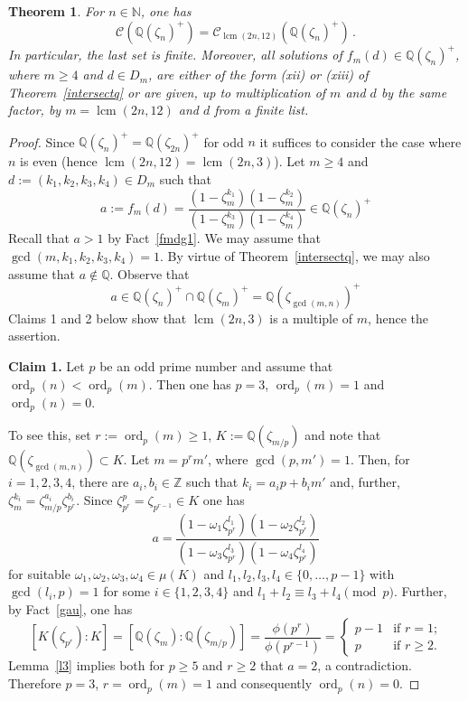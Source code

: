\documentclass[a4paper]{amsart}
\newtheorem{theorem}{Theorem}[section]
\theoremstyle{definition}
\numberwithin{equation}{section}
\numberwithin{theorem}{section}
\begin{document}
\begin{theorem}\label{t1}
For $n\in{\mathbb{N}}$, one has
$$\mathcal{C}({\mathbb{Q}}(\zeta_n)^+)=\mathcal{C}_{\operatorname{lcm}(2n,12)}({\mathbb{Q}}(\zeta_n)^+)\,.$$
In particular, the last set is finite. Moreover, all solutions of $f_{m}(d)\in{\mathbb{Q}}(\zeta_n)^+$, where $m\geq 4$ and
$d\in D_{m}$, are either of the form
(xii) or (xiii) of Theorem~\ref{intersectq} or are  given, up to multiplication of $m$
and $d$ by the same factor, by $m=\operatorname{lcm}(2n,12)$ and $d$
from a finite list. 
\end{theorem}
\begin{proof}
Since ${\mathbb{Q}}(\zeta_n)^+={\mathbb{Q}}(\zeta_{2n})^+$ for odd $n$ it suffices to
consider the case where $n$ is even (hence
$\operatorname{lcm}(2n,12)=\operatorname{lcm}(2n,3)$). Let $m\geq 4$
and $d:=(k_1,k_2,k_3,k_4)\in D_{m}$ such that
$$a:=f_m(d)=\frac{(1-\zeta_{m}^{k_1})(1-\zeta_{m}^{k_2})}{(1-\zeta_{m}^{k_3})(1-\zeta_{m}^{k_4})}\in{\mathbb{Q}}(\zeta_n)^+$$
Recall that $a>1$ by Fact~\ref{fmdg1}.  We may
assume that $\operatorname{gcd}(m,k_1,k_2,k_3,k_4)=1$.  By virtue of Theorem~\ref{intersectq}, we
may also assume that $a\not\in{\mathbb{Q}}$. Observe that
$$a\in{\mathbb{Q}}(\zeta_n)^+\cap {\mathbb{Q}}(\zeta_m)^+= {\mathbb{Q}}(\zeta_{\operatorname{gcd}(m,n)})^+$$
Claims 1 and 2 below show that $\operatorname{lcm}(2n,3)$ is a
multiple of $m$, hence the assertion.

 {\bf Claim 1.} Let $p$ be an odd prime number and assume that
 $\operatorname{ord}_p(n)<\operatorname{ord}_p(m)$. Then one has $p=3$,
$\operatorname{ord}_p(m)=1$ and $\operatorname{ord}_p(n)=0$.

To see this, set $r:=\operatorname{ord}_p(m)\geq 1$, 
$K:={\mathbb{Q}}(\zeta_{m/p})$ and note that $
{\mathbb{Q}}(\zeta_{\operatorname{gcd}(m,n)})\subset K$. Let $m=p^rm'$,
where $\operatorname{gcd}(p,m')=1$. Then, for $i=1,2,3,4$,
there are $a_i,b_i\in{\mathbb{Z}}$ such that $k_i=a_ip+b_i m'$ and, further, 
$\zeta_m^{k_i}=\zeta_{m/p}^{a_i}\zeta_{p^r}^{b_i}$. Since $\zeta_{p^r}^p=\zeta_{p^{r-1}}\in K$ one has 
$$
a=\frac{(1-\omega_1\zeta_{p^r}^{l_1})(1-\omega_2\zeta_{p^r}^{l_2})}{(1-\omega_3\zeta_{p^r}^{l_3})(1-\omega_4\zeta_{p^r}^{l_4})}
$$ 
for suitable $\omega_1,\omega_2,\omega_3,\omega_4\in\mu(K)$ and
$l_1,l_2,l_3,l_4\in\{0,\dots,p-1\}$ with $\operatorname{gcd}(l_i,p)=1$
for some $i\in\{1,2,3,4\}$ and $l_1+l_2\equiv l_3+l_4 \pmod
p$. Further, by Fact~\ref{gau}, one has
$$
[K(\zeta_{p^r}):K]=[{\mathbb{Q}}(\zeta_{m}):{\mathbb{Q}}(\zeta_{m/p})]=\frac{\phi(p^r)}{\phi(p^{r-1})}=\left\{\begin{array}{ll}
p-1 & \mbox{if $r=1$;}\\
p & \mbox{if $r\geq 2$.}
\end{array}\right.
$$
Lemma~\ref{l3} implies both for $p\geq
5$ and $r\geq 2$ that $a=2$, a contradiction. Therefore $p=3$,
$r=\operatorname{ord}_p(m)=1$ and consequently $\operatorname{ord}_p(n)=0$.


\end{proof}
\end{document}
